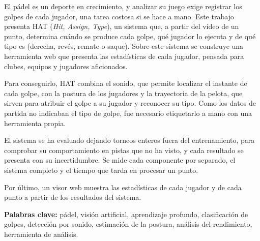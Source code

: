 
El pádel es un deporte en crecimiento, y analizar su juego exige registrar los golpes de cada jugador, una tarea costosa si se hace a mano.
Este trabajo presenta HAT (\textit{Hit, Assign, Type}), un sistema que, a partir del vídeo de un punto, determina cuándo se produce cada golpe, qué jugador lo ejecuta y de qué tipo es (derecha, revés, remate o saque).
Sobre este sistema se construye una herramienta web que presenta las estadísticas de cada jugador, pensada para clubes, equipos y jugadores aficionados.

Para conseguirlo, HAT combina el sonido, que permite localizar el instante de cada golpe, con la postura de los jugadores y la trayectoria de la pelota, que sirven para atribuir el golpe a su jugador y reconocer su tipo.
Como los datos de partida no indicaban el tipo de golpe, fue necesario etiquetarlo a mano con una herramienta propia.

El sistema se ha evaluado dejando torneos enteros fuera del entrenamiento, para comprobar su comportamiento en pistas que no ha visto, y cada resultado se presenta con su incertidumbre.
Se mide cada componente por separado, el sistema completo y el tiempo que tarda en procesar un punto.

Por último, un visor web muestra las estadísticas de cada jugador y de cada punto a partir de los resultados del sistema.

\vspace{\baselineskip}
\noindent\textbf{Palabras clave:} pádel, visión artificial, aprendizaje profundo, clasificación de golpes, detección por sonido, estimación de la postura, análisis del rendimiento, herramienta de análisis.
